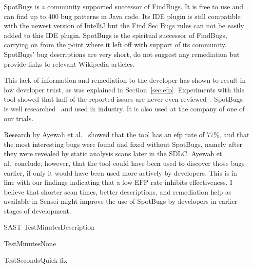 {
\label{bc:SpotBugs}
SpotBugs is a community supported successor of FindBugs.
It is free to use and can find up to 400 bug patterns in Java code.
Its IDE plugin is still compatible with the newest version of IntelliJ but the Find Sec Bugs rules can not be easily added to this IDE plugin.
SpotBugs is the spiritual successor of FindBugs, carrying on from the point where it left off with support of its community.
SpotBugs' bug descriptions are very short, do not suggest any remediation but provide links to relevant Wikipedia articles. 

This lack of information and remediation to the developer has shown to result in low developer trust, as was explained in Section~\ref{sec:efp}.
Experiments with this tool showed that half of the reported issues are never even reviewed~\cite{ayewah2007using}.
SpotBugs is well researched~\cite{ayewah2007using,ayewah2010google,findbugs2008} and used in industry.
It is also used at the company of one of our trials.

Research by Ayewah et al.~\cite{ayewah2007using} showed that the tool has an \gls{efp} rate of 77\%, and that the most interesting bugs were found and fixed without SpotBugs, namely after they were revealed by static analysis scans later in the SDLC. Ayewah et al.\ conclude, however, that the tool could have been used to discover those bugs earlier, if only it would have been used more actively by developers. This is in line with our findings indicating that a low EFP rate inhibits effectiveness. I believe that shorter scan times, better descriptions, and remediation help as available in Sensei might improve the use of SpotBugs by developers in earlier stages of development.
}{SAST}
{Test}{Minutes}{Description}

{Test}{Minutes}{None}

{Test}{Seconds}{Quick-fix}

